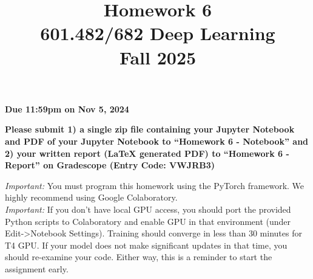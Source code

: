 \documentclass[a4paper]{article}
\title{Homework 6\\
	601.482/682 Deep Learning\\
	Fall 2025}
\begin{document}
	\maketitle

	\begin{center}
		\textbf{Due 11:59pm on Nov 5, 2024}
	\end{center}
	\begin{center}\textbf{Please submit 1) a single zip file containing your Jupyter Notebook and PDF of your Jupyter Notebook to ``Homework 6 - Notebook'' and 2) your written report (LaTeX generated PDF) to ``Homework 6 - Report'' on Gradescope (Entry Code: VWJRB3)}
	\end{center}

	\noindent \emph{Important:} You must program this homework using the PyTorch framework. We highly recommend using Google Colaboratory.\\

	\noindent \emph{Important:} If you don't have local GPU access, you should port the provided Python scripts to Colaboratory and enable GPU in that environment (under Edit->Notebook Settings). Training should converge in less than 30 minutes for T4 GPU. If your model does not make significant updates in that time, you should re-examine your code. Either way, this is a reminder to start the assignment early.
\end{document}

